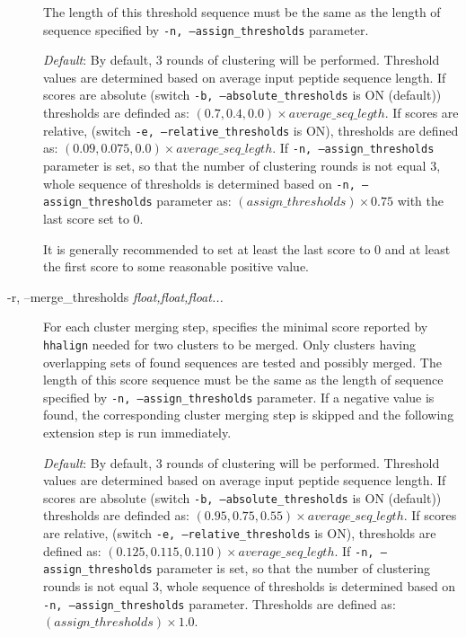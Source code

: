 \documentclass[11pt, a4paper, twoside, titlepage]{article}
\begin{document}
\begin{description}
	The length of this threshold sequence must be the same as the length of sequence specified by \texttt{-n, --assign\_thresholds} parameter.

\begin{sloppypar}	 
	 
	  \textit{Default}: By default, 3 rounds of clustering will be performed. Threshold values are determined based on average input peptide sequence length. If scores are absolute (switch \texttt{-b, --absolute\_thresholds} is ON (default)) thresholds are definded as: $(0.7, 0.4, 0.0)\times average\_seq\_legth$. If scores are relative, (switch \texttt{-e, --relative\_thresholds} is ON),  thresholds are defined as: $(0.09, 0.075, 0.0)\times average\_seq\_legth$.
	   If  \texttt{-n, --assign\_thresholds} parameter is set, so that the number of clustering rounds is not equal 3, whole sequence of thresholds is determined based on \texttt{-n, --assign\_thresholds} parameter as: $(assign\_thresholds)\times 0.75$ with the last score set to 0.
	  
	  It is generally recommended to set at least the last score to 0 and at least the first score to some reasonable positive value.
	  
\end{sloppypar}
	
	  \item[-r, --merge\_thresholds \rm \textlangle \textit{float,float,float...}\textrangle] For each cluster merging step, specifies the minimal score reported by \texttt{hhalign} needed for two clusters to be merged. Only clusters having overlapping sets of found sequences are tested and possibly merged. The length of this score sequence must be the same as the length of sequence specified by \texttt{-n, --assign\_thresholds} parameter. If a negative value is found, the corresponding cluster merging step is skipped and the following extension step is run immediately.
	  
\begin{sloppypar}	
	 
	  \textit{Default}: By default, 3 rounds of clustering will be performed. Threshold values are determined based on average input peptide sequence length. If scores are absolute (switch \texttt{-b, --absolute\_thresholds} is ON (default)) thresholds are definded as: $(0.95, 0.75, 0.55)\times average\_seq\_legth$. If scores are relative, (switch \texttt{-e, --relative\_thresholds} is ON), thresholds are defined as: $(0.125, 0.115, 0.110)\times average\_seq\_legth$. If  \texttt{-n, --assign\_thresholds} parameter is set, so that the number of clustering rounds is not equal 3, whole sequence of thresholds is determined based on \texttt{-n, --assign\_thresholds} parameter. Thresholds are defined as: $(assign\_thresholds)\times 1.0$.
	  

\end{sloppypar}
\end{description}
\end{document}
